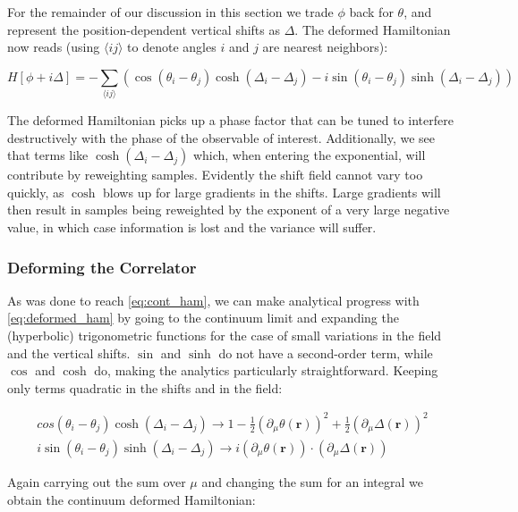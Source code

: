 \documentclass[12pt]{article}
\begin{document}
For the remainder of our discussion in this section
we trade $\phi$ back for $\theta$, and represent the position-dependent vertical shifts as $\Delta$. The deformed Hamiltonian now reads 
(using $\langle ij \rangle$ to denote angles $i$ and $j$ are nearest neighbors):

\begin{equation} \label{eq:deformed_ham}
	H[\phi + i \Delta] = -\sum_{\langle ij \rangle} \left(\cos(\theta_i-\theta_j)\cosh(\Delta_i-\Delta_j) -
	i \sin(\theta_i-\theta_j)\sinh(\Delta_i-\Delta_j) \right)
\end{equation}

The deformed Hamiltonian picks up a phase factor that can be tuned to interfere destructively with the phase of the observable of interest. 
Additionally, we see that terms like $\cosh(\Delta_i - \Delta_j)$ which, when entering the exponential, will contribute by reweighting samples. 
Evidently the shift field cannot vary too quickly, as $\cosh$ blows up for large gradients in the shifts. Large gradients will then result in samples being
reweighted by the exponent of a very large negative value, in which case information is lost and the variance will suffer.

\subsubsection{Deforming the Correlator}

As was done to reach \ref{eq:cont_ham}, we can make analytical progress with \ref{eq:deformed_ham} by going to the continuum limit and
expanding the (hyperbolic) trigonometric functions for the case of small variations in the field and the vertical shifts. $\sin$ and $\sinh$ do not
have a second-order term, while $\cos$ and $\cosh$ do, making the analytics particularly straightforward. Keeping only terms quadratic
in the shifts and in the field:

\begin{equation}
	\begin{split}
		cos(\theta_i-\theta_j)\cosh(\Delta_i-\Delta_j) \rightarrow 1 - \frac{1}{2}(\partial_\mu \theta(\mathbf{r}))^2 + \frac{1}{2}(\partial_\mu \Delta(\mathbf{r}))^2 \\
		i \sin(\theta_i-\theta_j)\sinh(\Delta_i-\Delta_j) \rightarrow i(\partial_\mu \theta(\mathbf{r})) \cdot (\partial_\mu \Delta(\mathbf{r}))
	\end{split}
\end{equation}

Again carrying out the sum over $\mu$ and changing the sum for an integral we obtain the continuum deformed Hamiltonian:
\end{document}
